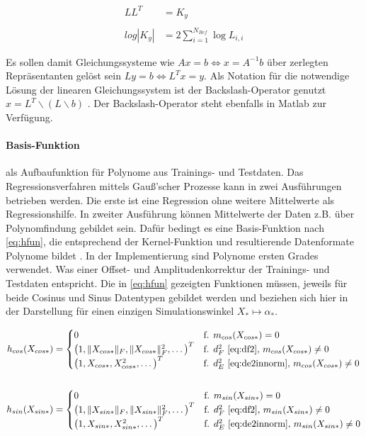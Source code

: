 \begin{align}\label{eq:chol}
		 LL^T &= K_y  \nonumber \\
		 \\
	log |K_y| &= 2 \sum_{i=1}^{N_{Ref}} \log L_{i,i} \nonumber
\end{align}


Es sollen damit Gleichungssysteme wie $Ax = b \Leftrightarrow x = A^{-1}b$ über zerlegten Repräsentanten gelöst sein $Ly = b \Leftrightarrow L^Tx = y$. Als Notation für die notwendige Lösung der linearen Gleichungssystem ist der Backslash-Operator genutzt $x = L^T \backslash (L \backslash b)$ \cite{Rasmussen2006}. Der Backslash-Operator steht ebenfalls in Matlab zur Verfügung.


\paragraph*{Basis-Funktion} als Aufbaufunktion für Polynome aus Trainings- und Testdaten. Das Regressionsverfahren mittels Gauß'scher Prozesse kann in zwei Ausführungen betrieben werden. Die erste ist eine Regression ohne weitere Mittelwerte als Regressionshilfe. In zweiter Ausführung können Mittelwerte der Daten z.B. über Polynomfindung gebildet sein. Dafür bedingt es eine Basis-Funktion nach \autoref{eq:hfun}, die entsprechend der Kernel-Funktion und resultierende Datenformate Polynome bildet \cite{Rasmussen2006}. In der Implementierung sind Polynome ersten Grades verwendet. Was einer Offset- und Amplitudenkorrektur der Trainings- und Testdaten entspricht. Die in \autoref{eq:hfun} gezeigten Funktionen müssen, jeweils für beide Cosinus und Sinus Datentypen gebildet werden und beziehen sich hier in der Darstellung für einen einzigen Simulationswinkel $X_* \mapsto \alpha_*$.


\begin{align}\label{eq:hfun}
	h_{cos}(X_{cos*}) &=
		\begin{cases}
			0								                          & \text{f. } m_{cos}(X_{cos*}) = 0 \\
			\big( 1, \|X_{cos*}\|_F, \|X_{cos*}\|_F^2, \ldots \big)^T & \text{f. } d_F^2 \text{ \eqref{eq:df2}, }       m_{cos}(X_{cos*}) \ne 0 \\
			\big( 1, X_{cos*}, X_{cos*}^2, \ldots \big)^T             & \text{f. } d_E^2 \text{ \eqref{eq:de2innorm}, } m_{cos}(X_{cos*}) \ne 0
		\end{cases} \nonumber \\
	\\
	h_{sin}(X_{sin*}) &=
		\begin{cases}
			0								                          & \text{f. } m_{sin}(X_{sin*}) = 0 \\
			\big( 1, \|X_{sin*}\|_F, \|X_{sin*}\|_F^2, \ldots \big)^T & \text{f. } d_F^2 \text{ \eqref{eq:df2}, }       m_{sin}(X_{sin*}) \ne 0 \\
			\big( 1, X_{sin*}, X_{sin*}^2, \ldots \big)^T             & \text{f. } d_E^2 \text{ \eqref{eq:de2innorm}, } m_{sin}(X_{sin*}) \ne 0
		\end{cases} \nonumber
\end{align}



